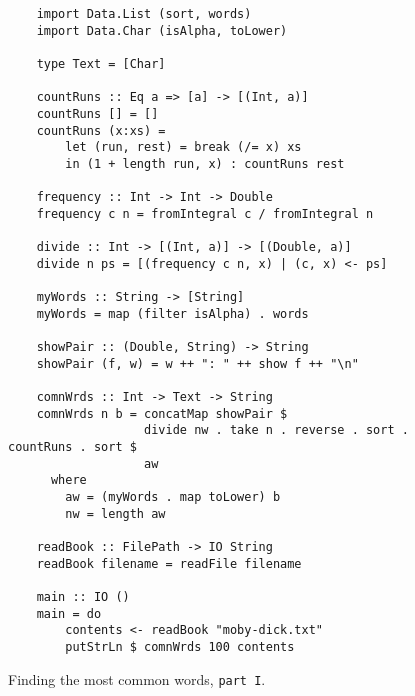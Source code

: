 \begin{figure}[!ht]
\centering
\begin{verbatim}
    import Data.List (sort, words)
    import Data.Char (isAlpha, toLower)
    
    type Text = [Char]
    
    countRuns :: Eq a => [a] -> [(Int, a)]
    countRuns [] = []
    countRuns (x:xs) =
        let (run, rest) = break (/= x) xs
        in (1 + length run, x) : countRuns rest
    
    frequency :: Int -> Int -> Double
    frequency c n = fromIntegral c / fromIntegral n 
    
    divide :: Int -> [(Int, a)] -> [(Double, a)]
    divide n ps = [(frequency c n, x) | (c, x) <- ps]
    
    myWords :: String -> [String]
    myWords = map (filter isAlpha) . words
    
    showPair :: (Double, String) -> String 
    showPair (f, w) = w ++ ": " ++ show f ++ "\n"
    
    comnWrds :: Int -> Text -> String
    comnWrds n b = concatMap showPair $
                   divide nw . take n . reverse . sort . countRuns . sort $
                   aw
      where
        aw = (myWords . map toLower) b
        nw = length aw
                     
    readBook :: FilePath -> IO String
    readBook filename = readFile filename
    
    main :: IO ()
    main = do
        contents <- readBook "moby-dick.txt"
        putStrLn $ comnWrds 100 contents
\end{verbatim} 
\vspace*{-0.3cm}
\caption{Finding the most common words, \texttt{part \texttt{I}}.}
\label{fig:common-words.hs}
\end{figure} %


